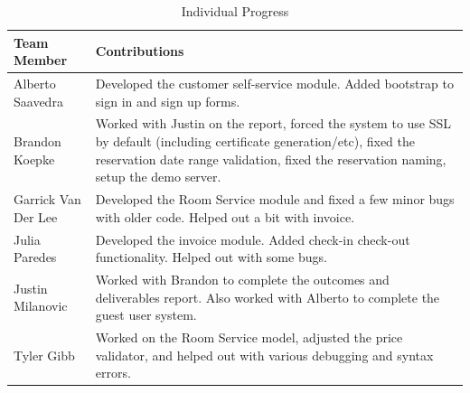 \documentclass[12pt]{elsarticle}
\begin{document}
\begin{table}[!ht]
  \begin{tabular}{|l|p{11cm}|}
    \hline
    \textbf{Team Member} & \textbf{Contributions} \\
    \hline
    Alberto Saavedra & Developed the customer self-service module. Added bootstrap to sign in and sign up forms. \\
    \hline
    Brandon Koepke & Worked with Justin on the report, forced the system to use SSL by default (including certificate generation/etc), fixed the reservation date range validation, fixed the reservation naming, setup the demo server. \\
    \hline
    Garrick Van Der Lee & Developed the Room Service module and fixed a few minor bugs with older code. Helped out a bit with invoice. \\
    \hline
    Julia Paredes & Developed the invoice module. Added check-in check-out functionality. Helped out with some bugs. \\
    \hline
    Justin Milanovic & Worked with Brandon to complete the outcomes and deliverables report. Also worked with Alberto to complete the guest user system. \\
    \hline
    Tyler Gibb & Worked on the Room Service model, adjusted the price validator, and helped out with various debugging and syntax errors. \\
    \hline
  \end{tabular}
	\caption{Individual Progress}
\end{table}
\end{document}
